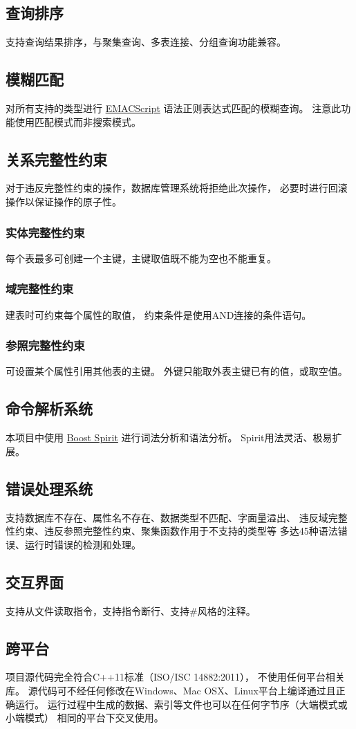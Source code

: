     \subsection{查询排序}
        支持查询结果排序，与聚集查询、多表连接、分组查询功能兼容。
    \subsection{模糊匹配}
        对所有支持的类型进行
        \href{http://ecma-international.org/ecma-262/5.1/#sec-15.10}{EMACScript}
        语法正则表达式匹配的模糊查询。%
        注意此功能使用匹配模式而非搜索模式。
    \subsection{关系完整性约束}
        对于违反完整性约束的操作，数据库管理系统将拒绝此次操作，%
        必要时进行回滚操作以保证操作的原子性。
        \subsubsection{实体完整性约束}
            每个表最多可创建一个主键，主键取值既不能为空也不能重复。
        \subsubsection{域完整性约束}
            建表时可约束每个属性的取值，%
            约束条件是使用AND连接的条件语句。%
        \subsubsection{参照完整性约束}
            可设置某个属性引用其他表的主键。%
            外键只能取外表主键已有的值，或取空值。
    \subsection{命令解析系统}
        本项目中使用
        \href{http://www.boost.org/doc/libs/1_57_0/libs/spirit/doc/html/index.html}{Boost Spirit}
        进行词法分析和语法分析。%
        Spirit用法灵活、极易扩展。
    \subsection{错误处理系统}
        支持数据库不存在、属性名不存在、数据类型不匹配、字面量溢出、%
        违反域完整性约束、违反参照完整性约束、聚集函数作用于不支持的类型等%
        多达45种语法错误、运行时错误的检测和处理。
    \subsection{交互界面}
        支持从文件读取指令，支持指令断行、支持\#风格的注释。
    \subsection{跨平台}
        项目源代码完全符合C++11标准（ISO/ISC 14882:2011），%
        不使用任何平台相关库。%
        源代码可不经任何修改在Windows、Mac OSX、Linux平台上编译通过且正确运行。%
        运行过程中生成的数据、索引等文件也可以在任何字节序（大端模式或小端模式）%
        相同的平台下交叉使用。



